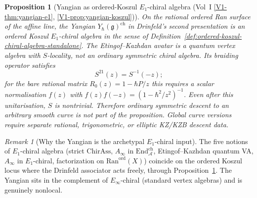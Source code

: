 \documentclass[11pt]{article}
\newtheorem{proposition}[theorem]{Proposition}
\theoremstyle{remark}
\newtheorem{remark}[theorem]{Remark}
\providecommand{\cA}{\mathcal{A}}
\providecommand{\Ran}{\mathrm{Ran}}
\providecommand{\End}{\mathrm{End}}
\providecommand{\fg}{\mathfrak{g}}
\providecommand{\Yhbar}{Y_{\hbar}}
\begin{document}
\begin{proposition}[Yangian as ordered-Koszul $E_1$-chiral algebra
(Vol~I
\ref*{V1-thm:yangian-e1}, \ref*{V1-prop:yangian-koszul})]%
\label{prop:yangian-ordered-koszul-standalone}%
On the rational ordered Ran surface of the affine line, the Yangian
$\Yhbar(\fg)^{\mathrm{ch}}$ in Drinfeld's second presentation is an
ordered Koszul $E_1$-chiral algebra in the sense of
Definition~\ref{def:ordered-koszul-chiral-algebra-standalone}.  The
Etingof--Kazhdan avatar is a quantum vertex algebra with $S$-locality,
not an ordinary symmetric chiral algebra.  Its braiding operator
satisfies
\[
  S^{21}(z)=S^{-1}(-z);
\]
for the bare rational matrix $R_0(z)=1-\hbar P/z$ this requires a
scalar normalisation $f(z)$ with
$f(z)f(-z)=(1-\hbar^2/z^2)^{-1}$.  Even after this unitarisation,
$S$ is nontrivial.  Therefore ordinary symmetric descent to an
arbitrary smooth curve is not part of the proposition.  Global curve
versions require separate rational, trigonometric, or elliptic
KZ/KZB descent data.
\end{proposition}

\begin{remark}[Why the Yangian is the archetypal $E_1$-chiral input]%
\label{rem:yangian-archetypal}%
The five notions of $E_1$-chiral algebra (strict $\mathrm{ChirAss}$,
$A_\infty$ in $\End^{\mathrm{ch}}_\cA$, Etingof--Kazhdan quantum VA,
$A_\infty$ in $E_1$-chiral, factorization on $\Ran^{\mathrm{ord}}(X)$)
coincide on the ordered Koszul locus where the Drinfeld associator
acts freely, through
Proposition~\ref{prop:yangian-ordered-koszul-standalone}. The Yangian
sits in the complement of $E_\infty$-chiral (standard vertex algebras)
and is genuinely nonlocal.
\end{remark}
\end{document}
